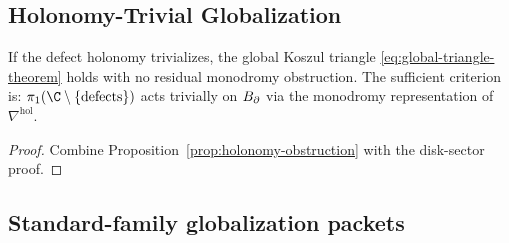 \subsection{Holonomy-Trivial Globalization}

\begin{corollary}
If the defect holonomy trivializes, the global Koszul triangle
\eqref{eq:global-triangle-theorem} holds with no residual monodromy
obstruction.
The sufficient criterion is: $\pi_1(\C\setminus\{\text{defects}\})$
acts trivially on $B_{\partial}$ via the monodromy representation of
$\nabla^{\mathrm{hol}}$.
\end{corollary}

\begin{proof}
Combine Proposition~\ref{prop:holonomy-obstruction} with the disk-sector
proof.
\end{proof}


\subsection{Standard-family globalization packets}

